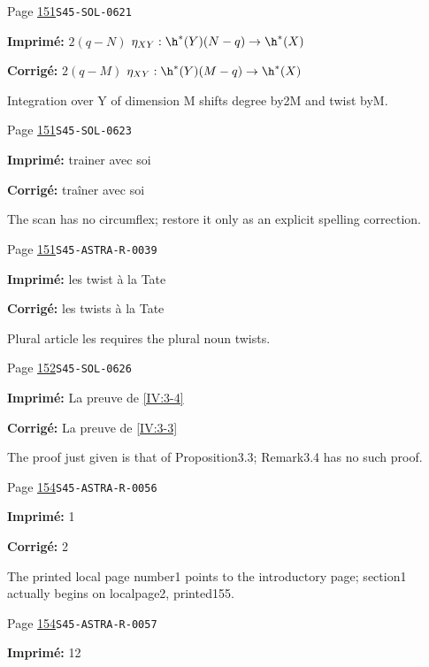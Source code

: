 \begin{description}
\smallskip
\item[\hypertarget{apparatus:FR-0118}{118}] Page \hyperlink{printpage:fr:151}{151}\quad\texttt{S45-SOL-0621}
\par\noindent\textbf{Imprimé:} $2(q-N)$ $\eta_{XY}:\h^*(Y)(N-q)\to \h^*(X)$
\par\noindent\textbf{Corrigé:} $2(q-M)$ $\eta_{XY}:\h^*(Y)(M-q)\to \h^*(X)$
\par\noindent Integration over Y of dimension M shifts degree by2M and twist byM.
\smallskip
\item[\hypertarget{apparatus:FR-0119}{119}] Page \hyperlink{printpage:fr:151}{151}\quad\texttt{S45-SOL-0623}
\par\noindent\textbf{Imprimé:} trainer avec soi
\par\noindent\textbf{Corrigé:} traîner avec soi
\par\noindent The scan has no circumflex; restore it only as an explicit spelling correction.
\smallskip
\item[\hypertarget{apparatus:FR-0120}{120}] Page \hyperlink{printpage:fr:151}{151}\quad\texttt{S45-ASTRA-R-0039}
\par\noindent\textbf{Imprimé:} les twist à la Tate
\par\noindent\textbf{Corrigé:} les twists à la Tate
\par\noindent Plural article les requires the plural noun twists.
\smallskip
\item[\hypertarget{apparatus:FR-0121}{121}] Page \hyperlink{printpage:fr:152}{152}\quad\texttt{S45-SOL-0626}
\par\noindent\textbf{Imprimé:} La preuve de \ref{IV:3-4}
\par\noindent\textbf{Corrigé:} La preuve de \ref{IV:3-3}
\par\noindent The proof just given is that of Proposition3.3; Remark3.4 has no such proof.
\smallskip
\item[\hypertarget{apparatus:FR-0122}{122}] Page \hyperlink{printpage:fr:154}{154}\quad\texttt{S45-ASTRA-R-0056}
\par\noindent\textbf{Imprimé:} 1
\par\noindent\textbf{Corrigé:} 2
\par\noindent The printed local page number1 points to the introductory page; section1 actually begins on localpage2, printed155.
\smallskip
\item[\hypertarget{apparatus:FR-0123}{123}] Page \hyperlink{printpage:fr:154}{154}\quad\texttt{S45-ASTRA-R-0057}
\par\noindent\textbf{Imprimé:} 12

\end{description}
